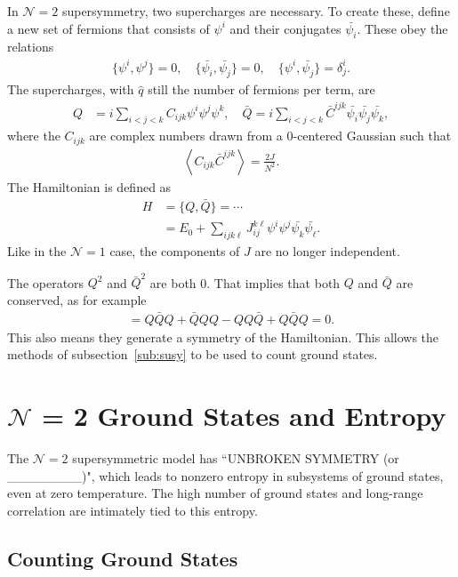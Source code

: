 \documentclass[12pt]{article} %
\renewcommand{\cal}{\mathcal}
\newcommand{\ex}[1]{\left\langle #1 \right\rangle}
\renewcommand{\l}{\ell}
\newcommand{\nn}{\nonumber\\}
\begin{document}
In $\cal N=2$ supersymmetry, two supercharges are necessary. To create these, define a new set of fermions that consists of $\psi^i$ and their conjugates $\bar{\psi_i}$. These obey the relations 
\begin{align}
\{\psi^i,\psi^j\} = 0, \quad \{\bar{\psi_i},\bar{\psi_j}\} = 0, \quad
	\{\psi^i,\bar{\psi_j}\} = \delta_j^i. \label{eqn:N2_ant}
\end{align}
The supercharges, with $\hat{q}$ still the number of fermions per term, are
\begin{align}
Q &= i\sum_{i<j<k}C_{ijk}\psi^i\psi^j\psi^k,\quad
\bar{Q} = i\sum_{i<j<k}\bar C^{ijk}\bar{\psi_i}\bar{\psi_j}\bar{\psi_k},
	\label{eqn:N2charge}
\end{align}
where the $C_{ijk}$ are complex numbers drawn from a 0-centered Gaussian such that
\begin{align}
\ex{C_{ijk}\bar C^{ijk}} = \frac{2J}{N^2}.
\end{align} 
The Hamiltonian is defined as 
\begin{align}
H &= \{Q, \bar Q\} = \cdots\nn
&= E_0 + \sum_{ijk\l}J_{ij}^{k\l}\psi^i\psi^j\bar{\psi_k}\bar{\psi_\l}.
\end{align}
Like in the $\cal N=1$ case, the components of $J$ are no longer independent. 

The operators $Q^2$ and $\bar Q^2$ are both 0. That implies that both $Q$ and $\bar Q$ are conserved, as for example
\begin{align}
[H,Q] = Q\bar QQ + \bar QQQ - QQ\bar Q + Q\bar QQ = 0.
\end{align}
This also means they generate a symmetry of the Hamiltonian. This allows the methods of subsection~\ref{sub:susy} to be used to count ground states.

\section{$\cal{N}$ = 2 Ground States and Entropy}

The $\cal N = 2$ supersymmetric model has ``UNBROKEN SYMMETRY (or \_\_\_\_\_\_\_\_)", which leads to nonzero entropy in subsystems of ground states, even at zero temperature. The high number of ground states and long-range correlation are intimately tied to this entropy.

\subsection{Counting Ground States} \emph{}
\end{document}
